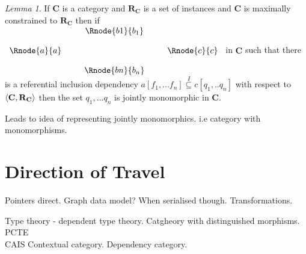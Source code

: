 \documentclass[10pt,a4paper]{article}
\theoremstyle{remark}
\newtheorem*{lemma*}{Lemma}
\newcommand{\catc}[1][C]{\textbf{#1}}
\newcommand{\reqt}{\textbf{R}}
\newcommand{\reqtc}[1][\catc]{\reqt_{#1}}
\newcommand{\Po}{\ensuremath{\textbf{Po}} }
\begin{document}
\begin{lemma*}
If $\catc$ is a category and $\reqtc$ is a set of instances and $\catc$ is maximally constrained to $\reqtc$
then if 
$
\begin{array}{c p{0.25cm} c  p{0.25cm} c }
             &&   \Rnode{b1}{b_1} &&              \\[0.4cm]
\Rnode{a}{a} &&                   && \Rnode{c}{c} \\[0.4cm]
             &&   \Rnode{bn}{b_n} &&              
\end{array} 
$
in $\catc$ such that there is a referential inclusion dependency $a[f_1,...f_n] \overset{I}{\subseteq} c[q_1,..q_n]$ with respect to $\tuple{\catc,\reqtc}$ then the set $q_1,...q_n$ is jointly monomorphic in $\catc$.
\end{lemma*}




Leads to idea of representing jointly monomorphics. i.e category with monomorphisms.

\section{Direction of Travel}
Pointers direct. Graph data model? When serialised though. Transformations.


Type theory - dependent type theory. Catgheory with distinguished morphisms. PCTE\\CAIS Contextual category. Dependency category.
\iffalse
\section*{Data Specification as Presentation of Category with  Monomorphisms}
\section*{Data Specification as Presentation of Category with Products and Monomorphisms}
\section*{Data Specification as Presentation of Category with Limits (and Monomorphisms)}
\section*{Data Specification as Presentation of $\Po$-enriched Category}
\fi
 

\end{document}
